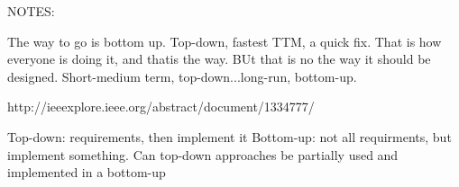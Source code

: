 

NOTES:

The way to go is bottom up. Top-down, fastest TTM, a quick fix. That is how everyone is doing it, and thatis the way. BUt that is no the way it should be designed. Short-medium term, top-down...long-run, bottom-up.

http://ieeexplore.ieee.org/abstract/document/1334777/

Top-down: requirements, then implement it
Bottom-up: not all requirments, but implement something. Can top-down approaches be partially used and implemented in a bottom-up


	

